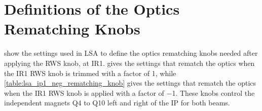 \section{Definitions of the Optics Rematching Knobs}
\label{section:optics_rematching_knobs_lsa}

 show the settings used in \gls{LSA} to define the \gls{optics} rematching knobs needed after applying the \gls{RWS} \gls{knob}, at IR\num{1}.
 gives the settings that rematch the optics when the IR\num{1} RWS knob is trimmed with a factor of \num{1}, while \cref{table:lsa_ip1_neg_rematching_knob} gives the settings that rematch the optics when the IR\num{1} RWS knob is applied with a factor of \num{-1}.
These knobs control the independent magnets Q\num{4} to Q\num{10} left and right of the \gls{IP} for both beams.

